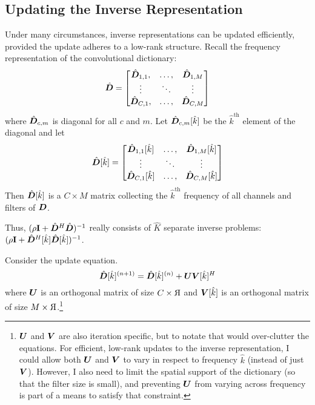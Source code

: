 \subsection{Updating the Inverse Representation}

Under many circumstances, inverse representations can be updated efficiently, provided the update adheres to a low-rank structure. Recall the frequency representation of the convolutional dictionary:
%
\begin{equation}
\hat{\bm{D}} = \begin{bmatrix}
\hat{\bm{D}}_{1,1}, & \hdots, & \hat{\bm{D}}_{1,M}\\
\vdots & \ddots & \vdots\\
\hat{\bm{D}}_{C,1}, & \hdots, & \hat{\bm{D}}_{C,M}
\end{bmatrix}
\end{equation}
%
where $\hat{\bm{D}}_{c,m}$ is diagonal for all $c$ and $m$. Let $\hat{\bm{D}}_{c,m}[\hat{k}]$ be the $\hat{k}^{\text{th}}$ element of the diagonal and let
%
\begin{equation}
\hat{\bm{D}}[\hat{k}] = \begin{bmatrix}
\hat{\bm{D}}_{1,1}[\hat{k}] & \hdots, & \hat{\bm{D}}_{1,M}[\hat{k}]\\
\vdots & \ddots & \vdots\\
\hat{\bm{D}}_{C,1}[\hat{k}] & \hdots, & \hat{\bm{D}}_{C,M}[\hat{k}]
\end{bmatrix}
\end{equation}
%
Then $\hat{\bm{D}}[\hat{k}]$ is a $C \times M$ matrix collecting the $\hat{k}^{\text{th}}$ frequency of all channels and filters of $\bm{D}$.

Thus, $(\rho{\bf I} + \hat{\bm{D}}^H\hat{\bm{D}})^{-1}$ really consists of $\hat{K}$ separate inverse problems: $(\rho{\bf I} + \hat{\bm{D}}^H[\hat{k}]\hat{\bm{D}}[\hat{k}])^{-1}$.

Consider the update equation.
%
\begin{equation}
\hat{\bm{D}}[\hat{k}]^{(n + 1)} = \hat{\bm{D}}[\hat{k}]^{(n)} + \bm{U}\bm{V}[\hat{k}]^H
\end{equation}
%
where $\bm{U}$ is an orthogonal matrix of size $C \times 
\reflectbox{R}$ and $\bm{V}[\hat{k}]$ is an orthogonal matrix of size $M \times 
\reflectbox{R}$.\footnote{$\bm{U}$ and $\bm{V}$ are also iteration specific, but to notate that would over-clutter the equations. For efficient, low-rank updates to the inverse representation, I could allow both $\bm{U}$ and $\bm{V}$ to vary in respect to frequency $\hat{k}$ (instead of just $\bm{V}$). However, I also need to limit the spatial support of the dictionary (so that the filter size is small), and preventing $\bm{U}$ from varying across frequency is part of a means to satisfy that constraint.}

